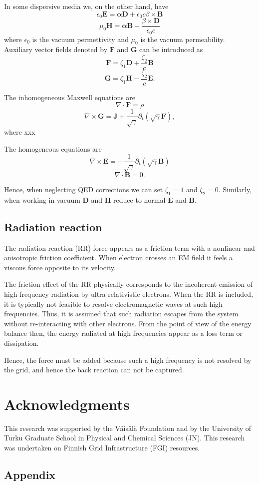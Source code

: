 \documentclass{aa}
\newcommand{\be}{\begin{equation}}
\newcommand{\ee}{\end{equation}}
\renewcommand{\vec}[1]{\ensuremath{\boldsymbol{#1}}}
\begin{document}
In some dispersive media we, on the other hand, have
\be
\epsilon_0 \vec{E} = \vec{\alpha} \vec{D} + \epsilon_0 c \beta \times \vec{B}
\ee
\be
\mu_0 \vec{H} = \vec{\alpha} \vec{B} - \frac{\beta \times \vec{D}}{\epsilon_0 c}
\ee
where $\epsilon_0$ is the vacuum permettivity and $\mu_0$ is the vacuum permeability.
Auxiliary vector fields denoted by $\vec{F}$ and $\vec{G}$ can be introduced as
\be
\vec{F} = \zeta_1 \vec{D} + \frac{\zeta_2}{c} \vec{B}
\ee
\be
\vec{G} = \zeta_1 \vec{H} - \frac{\zeta_2}{c} \vec{E}.
\ee

The inhomogeneous Maxwell equations are
\be
\nabla \cdot \vec{F} = \rho
\ee
\be
\nabla \times \vec{G} = \vec{J} + \frac{1}{\sqrt{\gamma}} \partial_t (\sqrt{\gamma} \vec{F}),
\ee
where xxx

The homogeneous equations are
\be
\nabla \times \vec{E} = -\frac{1}{\sqrt{\gamma}} \partial_t (\sqrt{\gamma} \vec{B})\ee
\be
\nabla \cdot \vec{B} = 0.
\ee

Hence, when neglecting QED corrections we can set $\zeta_1=1$ and $\zeta_2=0$.
Similarly, when working in vacuum $\vec{D}$ and $\vec{H}$ reduce to normal $\vec{E}$ and $\vec{B}$.



\subsection{Radiation reaction}

The radiation reaction (RR) force appears as a friction term with a nonlinear and anisotropic friction coefficient. 
When electron crosses an EM field it feels a viscous force opposite to its velocity.

The friction effect of the RR physically corresponds to the incoherent emission of high-frequency radiation by ultra-relativistic electrons.
When the RR is included, it is typically not feasible to resolve electromagnetic waves at such high frequencies.
Thus, it is assumed that such radiation escapes from the system without re-interacting with other electrons.
From the point of view of the energy balance then, the energy radiated at high frequencies appear as a loss term or dissipation.

Hence, the force must be added because such a high frequency is not resolved by the grid, and hence the back reaction can not be captured.






\section*{Acknowledgments}
This research was supported by the V\"ais\"al\"a Foundation and by the University of Turku Graduate School in Physical and Chemical Sciences (JN).
This research was undertaken on Finnish Grid Infrastructure (FGI) resources.








\clearpage
\begin{appendix}
\section{Appendix}


\end{appendix}
\end{document}
